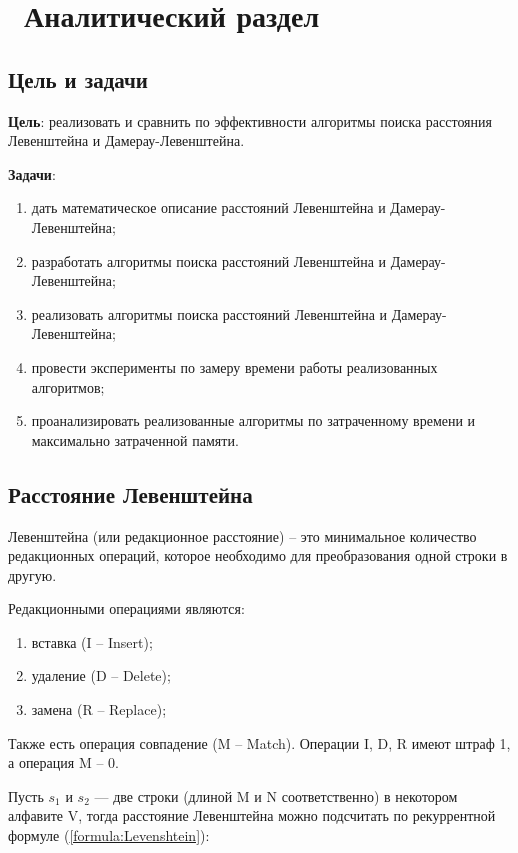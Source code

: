 \chapter{ Аналитический раздел}
\label{cha:analytical}
    \section{Цель и задачи}

    {\bf Цель}: реализовать и сравнить по эффективности алгоритмы поиска
    расстояния Левенштейна и Дамерау-Левенштейна.

    {\bf Задачи}:
    \begin{enumerate}
        \item дать математическое описание расстояний Левенштейна и Дамерау-Левенштейна;
        \item разработать алгоритмы поиска расстояний Левенштейна и Дамерау-Левенштейна;
        \item реализовать алгоритмы поиска расстояний Левенштейна и Дамерау-Левенштейна;
        \item провести эксперименты по замеру времени работы реализованных алгоритмов;
        \item проанализировать реализованные алгоритмы по затраченному времени и максимально затраченной памяти.
    \end{enumerate}

    \section{Расстояние Левенштейна}

    { Левенштейна} (или редакционное расстояние) -- это минимальное
    количество редакционных операций, которое необходимо для преобразования одной строки в другую.

    Редакционными операциями являются: \begin{enumerate}
        \item вставка (I -- Insert);
        \item удаление (D -- Delete);
        \item замена (R -- Replace);
    \end{enumerate}

    Также есть операция совпадение (M -- Match).
    Операции I, D, R имеют штраф 1, а операция M -- 0.

    Пусть $s_{1}$ и $s_{2}$ — две строки (длиной M и N соответственно) в некотором алфавите V,
    тогда расстояние Левенштейна можно подсчитать по рекуррентной формуле (\ref{formula:Levenshtein}):

